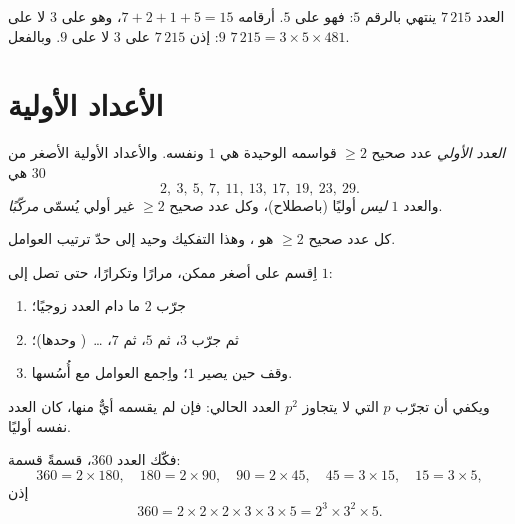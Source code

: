 \begin{example}
العدد $7\,215$ ينتهي بالرقم $5$: فهو  على $5$. 
أرقامه $7 + 2 + 1 + 5 = 15$، وهو  على $3$ لا على $9$:
إذن $7\,215$  على $3$ لا على $9$. وبالفعل
$7\,215 = 3 \times 5 \times 481$.
\end{example}

\section{الأعداد الأولية}

\begin{definition}\label{def:g9:arith:prime}
\emph{العدد الأولي} عدد صحيح $\geq 2$
قواسمه الوحيدة هي $1$ ونفسه. والأعداد الأولية الأصغر من $30$ هي
\[
2,\ 3,\ 5,\ 7,\ 11,\ 13,\ 17,\ 19,\ 23,\ 29 .
\]
والعدد $1$ \emph{ليس} أوليًا (باصطلاح)، وكل عدد صحيح $\geq 2$
غير أولي يُسمّى \emph{مركّبًا}.
\end{definition}

\begin{theorem}\label{thm:g9:arith:factorization}
كل عدد صحيح $\geq 2$ هو  ، وهذا
التفكيك وحيد إلى حدّ ترتيب العوامل.
\end{theorem}
\admitted

\begin{method}\label{met:g9:arith:factorization}
اِقسم على أصغر  ممكن، مرارًا وتكرارًا، حتى تصل إلى $1$:
\begin{enumerate}
  \item جرّب $2$ ما دام العدد زوجيًا؛
  \item ثم جرّب $3$، ثم $5$، ثم $7$، \dots\ ( وحدها)؛
  \item وقف حين يصير  $1$؛ واِجمع العوامل مع
        أُسُسها.
\end{enumerate}
ويكفي أن تجرّب  $p$ التي لا يتجاوز $p^2$ العدد
الحالي: فإن لم يقسمه أيٌّ منها، كان العدد نفسه أوليًا.
\end{method}

\begin{example}\label{ex:g9:arith:factorization}
فكّك العدد $360$، قسمةً قسمة:
\[
360 = 2 \times 180, \quad
180 = 2 \times 90, \quad
90 = 2 \times 45, \quad
45 = 3 \times 15, \quad
15 = 3 \times 5,
\]
إذن
\[
360 = 2 \times 2 \times 2 \times 3 \times 3 \times 5 = 2^3 \times 3^2
\times 5 .
\]
\end{example}


